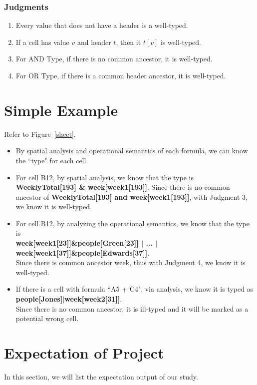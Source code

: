 \documentclass[a4paper]{article}
\begin{document}
\subsubsection{Judgments}
\begin{enumerate}
\item Every value that does not have a header is a well-typed.
\item If a cell has value $v$ and header $t$, then it $t[v]$ is well-typed.
\item For AND Type, if there is no common ancestor, it is well-typed. 
\item For OR Type, if there is a common header ancestor, it is well-typed.
\end{enumerate}


\section{Simple Example}
Refer to Figure~\ref{sheet}.
\begin{itemize}
\item By spatial analysis and operational semantics of each formula, we can know the ``type" for each cell. 
\item For cell B12, by spatial analysis, we know that the type is \textbf{WeeklyTotal[193] \& week[week1[193]]}. Since there is no common ancestor of \textbf{WeeklyTotal[193] and week[week1[193]]}, with Judgment 3, we know it is well-typed.
\item For cell B12, by analyzing the operational semantics, we know that the type is \\
\textbf{week[week1[23]]\&people[Green[23]] $|$ ... $|$ week[week1[37]]\&people[Edwards[37]]}. \\
Since there is common ancestor week, thus with Judgment 4, we know it is well-typed.
\item If there is a cell with formula ``A5 + C4", via analysis, we know it is typed as \textbf{people[Jones]$|$week[week2[31]]}.\\ 
Since there is no common ancestor, it is ill-typed and it will be marked as a potential wrong cell.
\end{itemize}

\section{Expectation of Project}
In this section, we will list the expectation output of our study.
\end{document}
